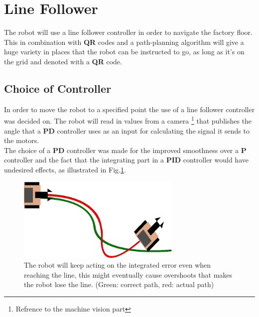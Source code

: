 \section{Line Follower}
The robot will use a line follower controller in order to navigate the factory floor. This in combination with \textbf{QR} codes and a path-planning algorithm will give a huge variety in places that the robot can be instructed to go, as long as it's on the grid and denoted with a \textbf{QR} code.

\subsection{Choice of Controller} \label{sec:choice_of_cont}

In order to move the robot to a specified point the use of a line follower controller was decided on. The robot will read in values from a camera \footnote{Refrence to the machine vision part} that publishes the angle that a \textbf{PD} controller uses as an input for calculating the signal it sends to the motors.\\
\indent The choice of a \textbf{PD} controller was made for the improved smoothness over a \textbf{P} controller and the fact that the integrating part in a \textbf{PID} controller would have undesired effects, as illustrated in Fig.\ref{fig:PID_bad}. 

\begin{figure}[H]
    \centering
    \includegraphics[width=0.7\textwidth]{img/Pid_bad.eps}
    \caption{The robot will keep acting on the integrated error even when reaching the line, this might eventually cause overshoots that makes the robot lose the line. (Green: correct path, red: actual path)  }
    \label{fig:PID_bad}
\end{figure}

